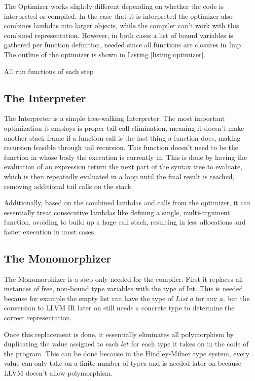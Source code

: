 \documentclass[12pt]{article}
\begin{document}
The Optimizer works slightly different depending on whether
the code is interpreted or compiled. In the case that it is interpreted
the optimizer also combines lambdas into larger objects,
while the compiler can't work with this combined representation.
However, in both cases a list of bound variables is gathered per function definition,
needed since all functions are closures in Imp.
The outline of the optimizer is shown in Listing \ref{listing:optimizer}.

All run functions of each step

\subsection{The Interpreter}
The Interpreter is a simple tree-walking Interpreter.
The most important optimization it employs is proper tail call elimination,
meaning it doesn't make another stack frame if a function call is the last
thing a function does, making recursion feasible through
tail recursion. This function doesn't need to be the function in whose body the
execution is currently in. This is done by having the evaluation of an expression return
the next part of the syntax tree to evaluate, which is then repeatedly evaluated in a loop until the final result
is reached, removing additional tail calls on the stack.

Additionally, based on the combined lambdas and calls from the optimizer, it can
essentially treat consecutive lambdas like defining a single, multi-argument
function, avoiding to build up a huge call stack, resulting in less allocations
and faster execution in most cases.

\subsection{The Monomorphizer}
The Monomorphizer is a step only needed for the compiler.
First it replaces all instances of free, non-bound type variables
with the type of Int. This is needed because for example the empty list
can have the type of $List\:a$ for any $a$, but the conversion to LLVM IR later on still needs a concrete
type to determine the correct representation.

Once this replacement is done, it essentially eliminates all polymorphism by duplicating
the value assigned to each $let$ for each type it takes on
in the code of the program. This can be done because
in the Hindley-Milner type system, every value
can only take on a finite number of types and is needed later on
because LLVM doesn't allow polymorphism.
\end{document}
